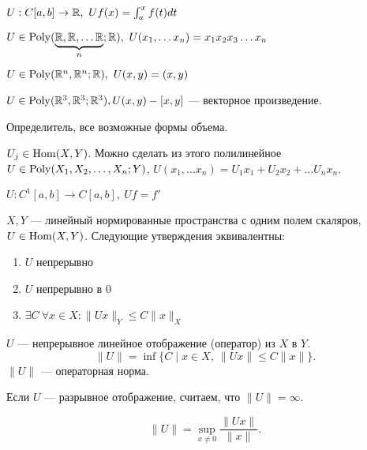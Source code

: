 \begin{ex}\label{ex_4_func}
    $ U: C[a, b] \to  \mathbb{R}, ~ Uf(x) = \int_{a}^{x} f(t)dt $
\end{ex}
\begin{ex}\label{ex_5_func}
    $ U \in \operatorname{Poly}(\underbrace{\mathbb{R}, \mathbb{R}, \ldots \mathbb{R}}_{n}; \mathbb{R}), ~ U(x_1, \ldots x_{n}) = x_1x_2x_3 \ldots x_{n}$
\end{ex}
\begin{ex}\label{ex_6_func}
    $ U \in \operatorname{Poly}(\mathbb{R}^{n}, \mathbb{R}^{n}; \mathbb{R}), ~ U(x, y) = (x, y)$
\end{ex}
\begin{ex}\label{ex_7_func}
    $ U \in \operatorname{Poly}(\mathbb{R}^3,\mathbb{R}^3;\mathbb{R}^3), U(x, y) - [x, y] $ --- векторное произведение.
\end{ex}
\begin{ex}\label{ex_8_func}
    Определитель, все возможные формы объема.
\end{ex}
\begin{ex}\label{ex_9_func}
    $ U_j \in \operatorname{Hom}(X, Y)$. Можно сделать из этого полилинейное $ U \in \operatorname{Poly}(X_1, X_2, \ldots , X_n; Y)$, $ U(x_1, \ldots x_{n}) = U_1x_1+ U_2x_2+ \ldots U_nx_{n}$.
\end{ex}
\begin{ex}\label{ex_10_func}
    $ U: C^{1}[a, b] \to  C[a,b], ~ Uf = f'$
\end{ex}
\begin{thm}
    $ X, Y$ --- линейный нормированные пространства с одним полем скаляров, $ U \in \operatorname{Hom}(X, Y)$.
    Следующие утверждения эквивалентны:
    \begin{enumerate}[noitemsep]
	\item $ U$ непрерывно
	\item $ U$ непрерывно в 0
	\item $ \exists C ~ \forall  x \in X \colon \| Ux \| _Y \le  C \| x \|_X $
    \end{enumerate}
\end{thm}
\begin{defn}
    $ U$ --- непрерывное  линейное отображение (оператор) из $ X$ в $ Y$.
    \[
	\| U \|  = \inf \{C \mid x \in X, ~ \| Ux \| \le C \| x \| \}
    .\]
    $ \| U \|  $ --- {\sf операторная норма}.
\end{defn}
\begin{note}
    Если $ U$ --- разрывное отображение, считаем, что $ \| U \|  = \infty$.
\end{note}
\begin{note}
    \[
	\| U \|  = \sup_{x \ne 0} \frac{\| Ux \|}{\| x \| }
    .\]
\end{note}
